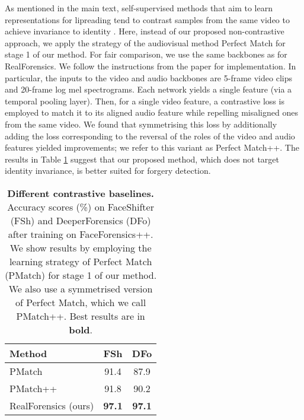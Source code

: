 \documentclass[10pt,twocolumn,letterpaper]{article}
\begin{document}
\begin{description}[wide,itemindent=\labelsep]
\item[Different contrastive baselines.] As mentioned in the main text, self-supervised methods that aim to learn representations for lipreading tend to contrast samples from the same video to achieve invariance to identity \cite{chung2019perfect, chung2016out, afouras2020self}. Here, instead of our proposed non-contrastive approach, we apply the strategy of the audiovisual method Perfect Match \cite{chung2019perfect} for stage 1 of our method. For fair comparison, we use the same backbones as for RealForensics. We follow the instructions from the paper for implementation. In particular, the inputs to the video and audio backbones are 5-frame video clips and 20-frame log mel spectrograms. Each network yields a single feature (via a temporal pooling layer). Then, for a single video feature, a contrastive loss is employed to match it to its aligned audio feature while repelling misaligned ones from the same video. We found that symmetrising this loss by additionally adding the loss corresponding to the reversal of the roles of the video and audio features yielded improvements; we refer to this variant as Perfect Match++. The results in Table \ref{table:pmatch} suggest that our proposed method, which does not target identity invariance, is better suited for forgery detection. 

\begin{table}
\begin{center}
\begin{tabular}{l c c}\toprule
Method & FSh & DFo \\ \midrule
PMatch & 91.4 & 87.9 \\
PMatch++ & 91.8 & 90.2 \\ \midrule
RealForensics (ours) & \textbf{97.1} & \textbf{97.1} \\ \bottomrule
\end{tabular}
\end{center}
\caption{\textbf{Different contrastive baselines.} Accuracy scores (\%) on FaceShifter (FSh) and DeeperForensics (DFo) after training on FaceForensics++. We show results by employing the learning strategy of Perfect Match \cite{chung2019perfect} (PMatch) for stage 1 of our method. We also use a symmetrised version of Perfect Match, which we call PMatch++. Best results are in \textbf{bold}.}
\label{table:pmatch}
\end{table}


\end{description}
\end{document}
